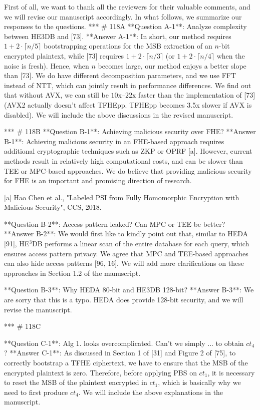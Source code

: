 First of all, 
we want to thank all the reviewers for their valuable comments,
and we will revise our manuscript accordingly.
In what follows, we summarize our responses to the questions.
*** 
# 118A 
**Question A-1**: Analyze complexity between HE3DB and [73].  
**Answer A-1**: 
In short, our method requires $1+2 \cdot \lceil n/5\rceil$ bootstrapping operations
for the MSB extraction of an $n$-bit encrypted plaintext,
while [73] requires $1+2 \cdot \lceil n/3 \rceil$ 
(or $1+2 \cdot \lceil n/4 \rceil$ when the noise is fresh). 
Hence, when $n$ becomes large, 
our method enjoys a better slope than [73].
We do have different decomposition parameters, and
we use FFT instead of NTT, which can jointly result in performance 
differences. We find out that without AVX,
we can still be $10$x--$22$x faster than the
implementation of [73] (AVX2 actually doesn't
affect TFHEpp. TFHEpp becomes 3.5x slower if AVX is disabled).
We will include the above discussions in the revised manuscript.

*** 
# 118B
**Question B-1**: Achieving malicious security over FHE?  
**Answer B-1**: 
Achieving malicious security in an FHE-based approach 
requires additional cryptographic techniques 
such as ZKP or OPRF [a]. 
However, current methods result in relatively high computational 
costs, and can be slower than TEE or MPC-based approaches. 
We do believe that providing malicious security for FHE
is an important and promising direction of research.

[a] Hao Chen et al., "Labeled PSI from Fully Homomorphic Encryption with 
Malicious Security", CCS, 2018.

**Question B-2**: Access pattern leaked? Can MPC or TEE be better?  
**Answer B-2**: 
We would first like to kindly point out that, similar to HEDA [91], 
HE$^3$DB performs a linear scan of the entire database for each query,
which ensures access pattern privacy.
We agree that MPC and TEE-based approaches can also
hide access patterns [96, 16]. 
We will add more clarifications
on these approaches in Section 1.2 of the manuscript.

**Question B-3**: Why HEDA 80-bit and HE3DB 128-bit?  
**Answer B-3**: 
We are sorry that this is a typo. HEDA does provide 128-bit
security, and we will revise the manuscript.

*** 
# 118C

**Question C-1**: Alg 1. looks overcomplicated. Can't we simply ... to obtain $ct_4$?  
**Answer C-1**: 
As discussed in Section 1 of [31] and Figure 2 of [75],
to correctly bootstrap a TFHE ciphertext, 
we have to ensure that the MSB of the encrypted plaintext is zero.
Therefore, before applying PBS on $ct_1$, 
it is necessary to reset the MSB of the plaintext
encrypted in $ct_1$, which is basically why we need to first produce
$ct_4$.
We will include the above explanations in the manuscript.

